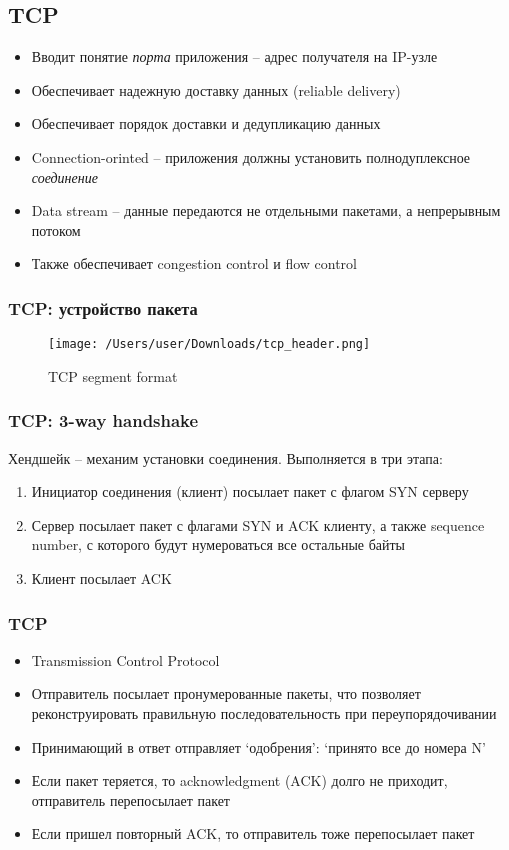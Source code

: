   \subsection{TCP}
    \begin{itemize}
      \item Вводит понятие \textit{порта} приложения -- адрес получателя на IP-узле
      \item Обеспечивает надежную доставку данных (reliable delivery)
      \item Обеспечивает порядок доставки и дедупликацию данных
      \item Connection-orinted -- приложения должны установить полнодуплексное \textit{соединение}
      \item Data stream -- данные передаются не отдельными пакетами, а непрерывным потоком
      \item Также обеспечивает congestion control и flow control
    \end{itemize}
  
  \subsubsection{TCP: устройство пакета}
\begin{figure}[H]
  \centering
  \texttt{[image: /Users/user/Downloads/tcp\_header.png]}
  \caption{TCP segment format}
  \label{fig:tcp_format}
\end{figure}
  
  \subsubsection{TCP: 3-way handshake}
    Хендшейк -- механим установки соединения. Выполняется в три этапа:
    \begin{enumerate}
      \item Инициатор соединения (клиент) посылает пакет с флагом SYN серверу
      \item Сервер посылает пакет с флагами SYN и ACK клиенту, а также sequence number, с которого будут нумероваться все остальные байты
      \item Клиент посылает ACK
    \end{enumerate}
  
  \subsubsection{TCP}
    \begin{itemize}
      \item Transmission Control Protocol
      \item Отправитель посылает пронумерованные пакеты, что позволяет реконструировать правильную последовательность при переупорядочивании 
      \item Принимающий в ответ отправляет `одобрения': `принято все до номера N'
      \item Если пакет теряется, то acknowledgment (ACK) долго не приходит, отправитель перепосылает пакет
      \item Если пришел повторный ACK, то отправитель тоже перепосылает пакет
    \end{itemize}
  
